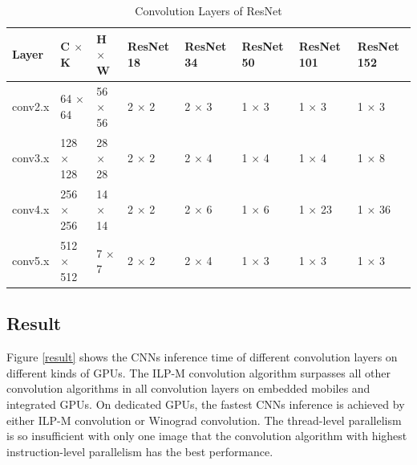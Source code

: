 \documentclass{article}
\begin{document}
\begin{table}[h!]
\centering
\caption{Convolution Layers of ResNet\label{reset_setting}}
\begin{tabular}{l|l|l|l|l|l|l|l}
\hline
Layer   & C $\times$ K     & H $\times$ W   & ResNet 18 & ResNet 34 & ResNet 50 & ResNet 101 & ResNet 152 \\ \hline
conv2.x & 64 $\times$ 64   & 56 $\times$ 56 & 2 $\times$ 2     & 2 $\times$ 3     & 1 $\times$ 3     & 1 $\times$ 3      & 1 $\times$ 3      \\
conv3.x & 128 $\times$ 128 & 28 $\times$ 28 & 2 $\times$ 2     & 2 $\times$ 4     & 1 $\times$ 4     & 1 $\times$ 4      & 1 $\times$ 8      \\
conv4.x & 256 $\times$ 256 & 14 $\times$ 14 & 2 $\times$ 2     & 2 $\times$ 6     & 1 $\times$ 6     & 1 $\times$ 23     & 1 $\times$ 36     \\
conv5.x & 512 $\times$ 512 & 7 $\times$ 7   & 2 $\times$ 2     & 2 $\times$ 4     & 1 $\times$ 3     & 1 $\times$ 3      & 1 $\times$ 3      \\ \hline
\end{tabular}
\end{table}







\subsection{Result}

Figure \ref{result} shows the CNNs inference time of different convolution layers on different kinds of GPUs. The ILP-M convolution algorithm surpasses all other convolution algorithms in all convolution layers on embedded mobiles and integrated GPUs. On dedicated GPUs, the fastest CNNs inference is achieved by either ILP-M convolution or Winograd convolution. The thread-level parallelism is so insufficient with only one image that the convolution algorithm with highest instruction-level parallelism has the best performance.
\end{document}
